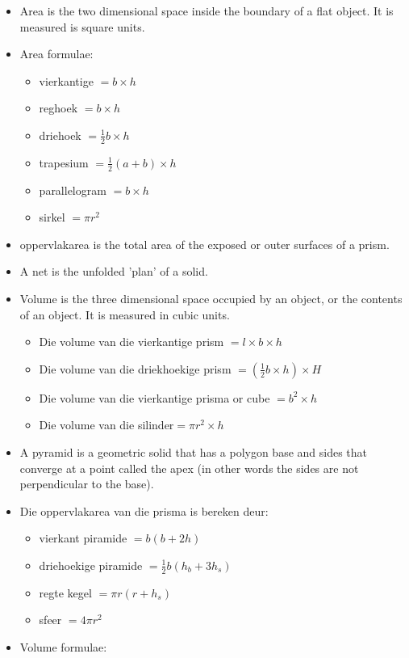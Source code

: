 \Opsomming
\begin{itemize}[noitemsep]
 \item Area is the two dimensional space inside the boundary of a flat object. It is measured
is square units.
\item Area formulae:
\begin{itemize}[noitemsep]
\item vierkantige $= b \times h$
\item reghoek $= b \times h$
\item driehoek $= \frac{1}{2} b \times h$
\item trapesium $= \frac{1}{2} (a+b) \times h$
\item parallelogram $= b \times h$
\item sirkel $= \pi r^2$
\end{itemize}
\item oppervlakarea is the total area of the exposed or outer surfaces of a prism.
\item A net is the unfolded 'plan' of a solid.
\item Volume is the three dimensional space occupied by an object, or the contents of an
object. It is measured in cubic units.
\begin{itemize}[noitemsep]
\item Die volume van die vierkantige prism $=l \times b \times h$
\item Die volume van die driekhoekige prism $= (\frac{1}{2} b \times h) \times H$
\item Die volume van die vierkantige prisma or cube $=b^2 \times h$
\item Die volume van die silinder$=\pi r^2 \times h$
\end{itemize}
\item A pyramid is a geometric solid that has a polygon base and sides that converge at a
point called the apex (in other words the sides are not perpendicular to the base).
\item Die oppervlakarea van die prisma is bereken deur:
\begin{itemize}[noitemsep]
\item vierkant piramide $=b(b+2h)$
\item driehoekige piramide $= \frac{1}{2}b(h_b +3h_s)$
\item regte kegel $= \pi r(r+h_s)$
\item sfeer $= 4\pi r^2$
\end{itemize}
\item Volume formulae:
\begin{itemize}[noitemsep]

\end{itemize}
\end{itemize}
